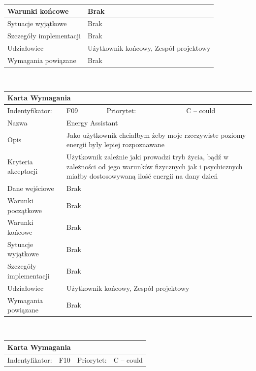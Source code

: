 \documentclass[a4paper,11pt]{report}
\begin{document}
\begin{itemize}
\begin{tabular}{|p{3cm}|p{2cm}|p{2cm}|p{6cm}|}
		\hline
		Warunki końcowe & \multicolumn{3}{|p{10 cm}|}{Brak}\\
		\hline
		Sytuacje wyjątkowe & \multicolumn{3}{|p{10 cm}|}{Brak}\\
		\hline
		Szczegóły implementacji & \multicolumn{3}{|p{10 cm}|}{Brak}\\
		\hline
		Udziałowiec & \multicolumn{3}{|p{10 cm}|}{Użytkownik końcowy, Zespół projektowy}\\
		\hline
		Wymagania powiązane & \multicolumn{3}{|p{10 cm}|}{Brak}\\
		\hline
		\end{tabular}\\
		\begin{tabular}{|p{3cm}|p{2cm}|p{2cm}|p{6cm}|}
		\hline
		\multicolumn{4}{|p{12 cm}|}{Karta Wymagania}\\
		\hline
		Indentyfikator: & F09 & Priorytet: & C – could\\
		\hline
		Nazwa & \multicolumn{3}{|p{10 cm}|}{Energy Assistant}\\
		\hline
		Opis & \multicolumn{3}{|p{10 cm}|}{Jako użytkownik chciałbym żeby moje rzeczywiste poziomy energii były lepiej rozpoznawane }\\
		\hline
		Kryteria akceptacji & \multicolumn{3}{|p{10 cm}|}{Użytkownik zależnie jaki prowadzi tryb życia, bądź w zależności od jego warunków fizycznych jak i psychicznych miałby dostosowywaną ilość energii na dany dzień}\\
		\hline
		Dane wejściowe & \multicolumn{3}{|p{10 cm}|}{Brak}\\
		\hline
		Warunki początkowe & \multicolumn{3}{|p{10 cm}|}{Brak}\\
		\hline
		Warunki końcowe & \multicolumn{3}{|p{10 cm}|}{Brak}\\
		\hline
		Sytuacje wyjątkowe & \multicolumn{3}{|p{10 cm}|}{Brak}\\
		\hline
		Szczegóły implementacji & \multicolumn{3}{|p{10 cm}|}{Brak}\\
		\hline
		Udziałowiec & \multicolumn{3}{|p{10 cm}|}{Użytkownik końcowy, Zespół projektowy}\\
		\hline
		Wymagania powiązane & \multicolumn{3}{|p{10 cm}|}{Brak}\\
		\hline
		\end{tabular}\\
		\begin{tabular}{|p{3cm}|p{2cm}|p{2cm}|p{6cm}|}
		\hline
		\multicolumn{4}{|p{12 cm}|}{Karta Wymagania}\\
		\hline
		Indentyfikator: & F10 & Priorytet: & C – could\\

\end{tabular}
\end{itemize}
\end{document}
